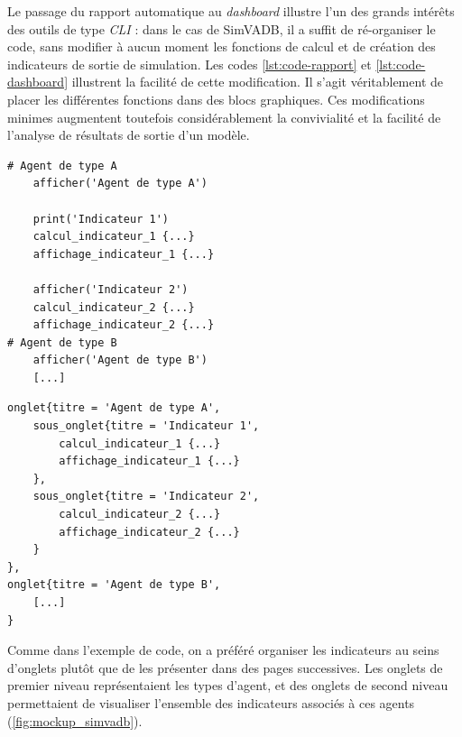 	Le passage du rapport automatique au \textit{dashboard} illustre l'un des grands intérêts des outils de type \textit{CLI} : dans le cas de SimVADB, il a suffit de ré-organiser le code, sans modifier à aucun moment les fonctions de calcul et de création des indicateurs de sortie de simulation.
	Les codes \ref{lst:code-rapport} et \ref{lst:code-dashboard} illustrent la facilité de cette modification.
	Il s'agit véritablement de placer les différentes fonctions dans des blocs graphiques.
	Ces modifications minimes augmentent toutefois considérablement la convivialité et la facilité de l'analyse de résultats de sortie d'un modèle.
\clearpage

\lstset{frame=shadowbox, tabsize=2}
\noindent\begin{minipage}[t]{.44\textwidth}
{\footnotesize
	\begin{lstlisting}[caption={Pseudo-code du rapport automatique.},frame=tlrb, captionpos=b, label = {lst:code-rapport}]
# Agent de type A
	afficher('Agent de type A')
	
	print('Indicateur 1')
	calcul_indicateur_1 {...}
	affichage_indicateur_1 {...}
	
	afficher('Indicateur 2')
	calcul_indicateur_2 {...}
	affichage_indicateur_2 {...}
# Agent de type B
	afficher('Agent de type B')
	[...]
	\end{lstlisting}
}
\end{minipage}\hfill
\begin{minipage}[t]{.53\textwidth}
{\footnotesize
	\begin{lstlisting}[caption={Pseudo-code du dashboard.},frame=tlrb, captionpos=b, label = {lst:code-dashboard}]
onglet{titre = 'Agent de type A',
	sous_onglet{titre = 'Indicateur 1',
		calcul_indicateur_1 {...}
		affichage_indicateur_1 {...}
	},
	sous_onglet{titre = 'Indicateur 2',
		calcul_indicateur_2 {...}
		affichage_indicateur_2 {...}
	}
},
onglet{titre = 'Agent de type B',
	[...]
}
	\end{lstlisting}
}
\end{minipage}
	
	Comme dans l'exemple de code, on a préféré organiser les indicateurs au seins d'onglets plutôt que de les présenter dans des pages successives.
	Les onglets de premier niveau représentaient les types d'agent, et des onglets de second niveau permettaient de visualiser l'ensemble des indicateurs associés à ces agents (\cref{fig:mockup_simvadb}).

